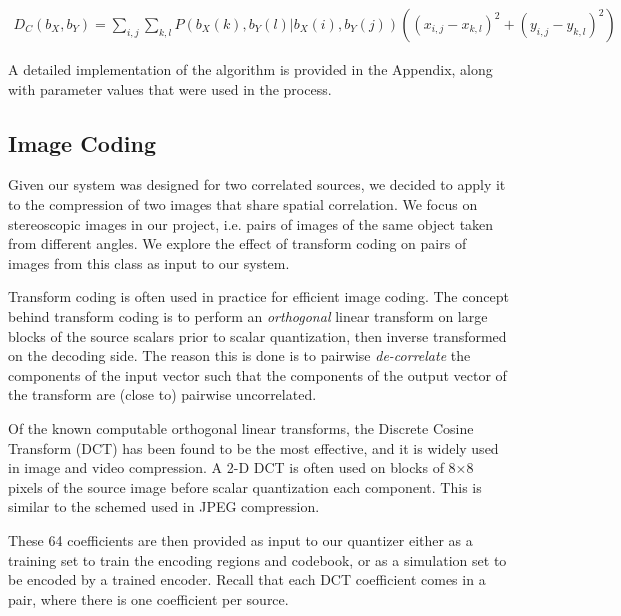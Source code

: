 \begin{align}
    \label{eq:energy}
    D_C(b_X,b_Y)=
        \sum_{i,j}
            \sum_{k,l}
            P(b_X(k), b_Y(l) | b_X(i), b_Y(j))
            \left((x_{i,j}-x_{k,l})^2+(y_{i,j}-y_{k,l})^2\right)
\end{align}

A detailed implementation of the algorithm is provided in the Appendix, along with parameter values that were used in the process.

\subsection{Image Coding}

Given our system was designed for two correlated sources, we decided to apply it to the compression of two images that share spatial correlation. We focus on stereoscopic images in our project, i.e. pairs of images of the same object taken from different angles. We explore the effect of transform coding on pairs of images from this class as input to our system.

Transform coding is often used in practice for efficient image coding. The concept behind transform coding is to perform an \emph{orthogonal} linear transform on large blocks of the source scalars prior to scalar quantization, then inverse transformed on the decoding side. The reason this is done is to pairwise \emph{de-correlate} the components of the input vector such that the components of the output vector of the transform are (close to) pairwise uncorrelated.

Of the known computable orthogonal linear transforms, the Discrete Cosine Transform (DCT) has been found to be the most effective, and it is widely used in image and video compression. A 2-D DCT is often used on blocks of 8$\times$8 pixels of the source image before scalar quantization each component. This is similar to the schemed used in JPEG compression. 

These 64 coefficients are then provided as input to our quantizer either as a training set to train the encoding regions and codebook, or as a simulation set to be encoded by a trained encoder. Recall that each DCT coefficient comes in a pair, where there is one coefficient per source.

